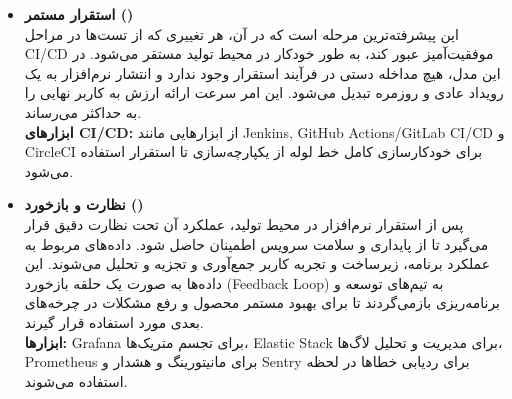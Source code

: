 \begin{itemize}
    \item \textbf{استقرار مستمر ()} \\
    این پیشرفته‌ترین مرحله است که در آن، هر تغییری که از تست‌ها در مراحل CI/CD موفقیت‌آمیز عبور کند، به طور خودکار در محیط تولید مستقر می‌شود. در این مدل، هیچ مداخله دستی در فرآیند استقرار وجود ندارد و انتشار نرم‌افزار به یک رویداد عادی و روزمره تبدیل می‌شود. این امر سرعت ارائه ارزش به کاربر نهایی را به حداکثر می‌رساند. \\
    \textbf{ابزارهای CI/CD:} از ابزارهایی مانند Jenkins, GitHub Actions/GitLab CI/CD و CircleCI برای خودکارسازی کامل خط لوله از یکپارچه‌سازی تا استقرار استفاده می‌شود.

    \item \textbf{نظارت و بازخورد ()} \\
    پس از استقرار نرم‌افزار در محیط تولید، عملکرد آن تحت نظارت دقیق قرار می‌گیرد تا از پایداری و سلامت سرویس اطمینان حاصل شود. داده‌های مربوط به عملکرد برنامه، زیرساخت و تجربه کاربر جمع‌آوری و تجزیه و تحلیل می‌شوند. این داده‌ها به صورت یک حلقه بازخورد (Feedback Loop) به تیم‌های توسعه و برنامه‌ریزی بازمی‌گردند تا برای بهبود مستمر محصول و رفع مشکلات در چرخه‌های بعدی مورد استفاده قرار گیرند. \\
    \textbf{ابزارها:} Grafana برای تجسم متریک‌ها، Elastic Stack برای مدیریت و تحلیل لاگ‌ها، Prometheus برای مانیتورینگ و هشدار و Sentry برای ردیابی خطاها در لحظه استفاده می‌شوند.
\end{itemize}
